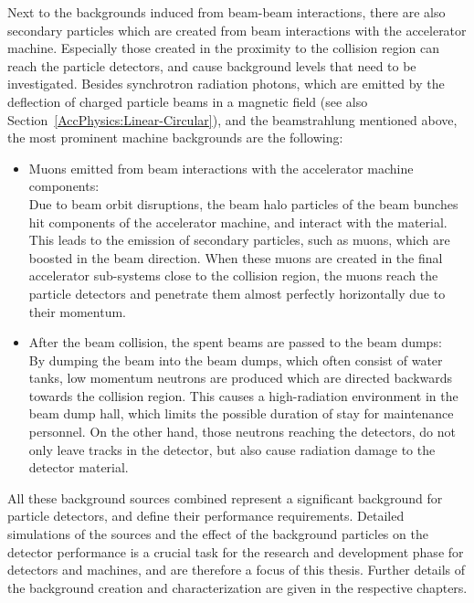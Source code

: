 Next to the backgrounds induced from beam-beam interactions, there are also secondary particles which are created from beam interactions with the accelerator machine.
Especially those created in the proximity to the collision region can reach the particle detectors, and cause background levels that need to be investigated.
Besides synchrotron radiation photons, which are emitted by the deflection of charged particle beams in a magnetic field (see also Section~\ref{AccPhysics:Linear-Circular}), and the beamstrahlung mentioned above, the most prominent machine backgrounds are the following:
\begin{itemize}
 \item Muons emitted from beam interactions with the accelerator machine components:
 \\Due to beam orbit disruptions, the beam halo particles of the beam bunches hit components of the accelerator machine, and interact with the material.
 This leads to the emission of secondary particles, such as muons, which are boosted in the beam direction.
 When these muons are created in the final accelerator sub-systems close to the collision region, the muons reach the particle detectors and penetrate them almost perfectly horizontally due to their momentum.
 \item After the beam collision, the spent beams are passed to the beam dumps:
 \\By dumping the beam into the beam dumps, which often consist of water tanks, low momentum neutrons are produced which are directed backwards towards the collision region.
 This causes a high-radiation environment in the beam dump hall, which limits the possible duration of stay for maintenance personnel.
 On the other hand, those neutrons reaching the detectors, do not only leave tracks in the detector, but also cause radiation damage to the detector material.
\end{itemize}
All these background sources combined represent a significant background for particle detectors, and define their performance requirements.
Detailed simulations of the sources and the effect of the background particles on the detector performance is a crucial task for the research and development phase for detectors and machines, and are therefore a focus of this thesis.
Further details of the background creation and characterization are given in the respective chapters.
